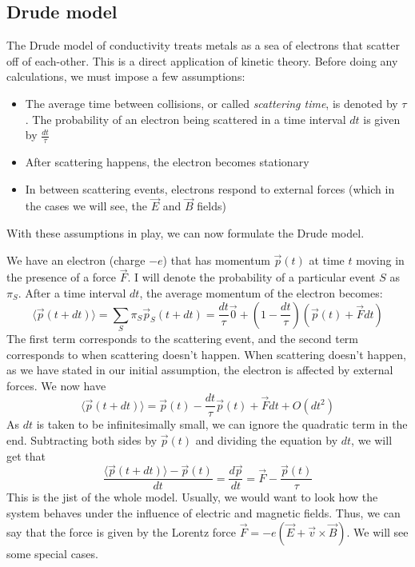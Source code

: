 \documentclass[12pt]{article}
\begin{document}
\subsection{Drude model}
The Drude model of conductivity treats metals as a sea of electrons that scatter off of each-other. This is a direct application of kinetic theory. Before doing any calculations, we must impose a few assumptions:
\begin{itemize}
    \item The average time between collisions, or called \textit{scattering time}, is denoted by $\tau$. The probability of an electron being scattered in a time interval $dt$ is given by $\frac{dt}{\tau}$
    \item After scattering happens, the electron becomes stationary
    \item In between scattering events, electrons respond to external forces (which in the cases we will see, the $\vec{E}$ and $\vec{B}$ fields)
\end{itemize}
With these assumptions in play, we can now formulate the Drude model.

\vspace{0.25 in}


We have an electron (charge $-e$) that has momentum $\vec{p}(t)$ at time $t$ moving in the presence of a force $\vec{F}$. I will denote the probability of a particular event $S$ as $\pi_S$. After a time interval $dt$, the average momentum of the electron becomes:
\begin{equation*}
    \langle \vec{p}(t+dt)\rangle=\sum_S \pi_S\vec{p}_S(t+dt)=\frac{dt}{\tau}\vec{0}+(1-\frac{dt}{\tau})(\vec{p}(t)+\vec{F}dt)
\end{equation*}
The first term corresponds to the scattering event, and the second term corresponds to when scattering doesn't happen. When scattering doesn't happen, as we have stated in our initial assumption, the electron is affected by external forces. We now have
\begin{equation*}
    \langle \vec{p}(t+dt)\rangle=\vec{p}(t)-\frac{dt}{\tau}\vec{p}(t)+\vec{F}dt+O(dt^2)
\end{equation*}
As $dt$ is taken to be infinitesimally small, we can ignore the quadratic term in the end. Subtracting both sides by $\vec{p}(t)$ and dividing the equation by $dt$, we will get that
\begin{equation*}
     \frac{\langle \vec{p}(t+dt)\rangle-\vec{p}(t)}{dt}=\frac{d\vec{p}}{dt}=\vec{F}-\frac{\vec{p}(t)}{\tau}
\end{equation*}
This is the jist of the whole model. Usually, we would want to look how the system behaves under the influence of electric and magnetic fields. Thus, we can say that the force is given by the Lorentz force $\vec{F}=-e(\vec{E}+\vec{v}\times\vec{B})$. We will see some special cases.
\end{document}
